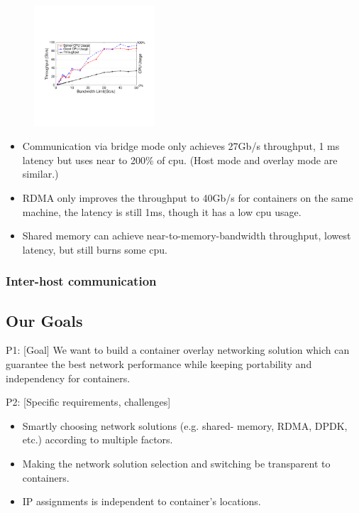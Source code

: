      \begin{figure}[ht]
     \centering 
     \includegraphics[width=0.4\textwidth]{figures/motivation/eval_bw_cpu.pdf}      
     \label{fig:eval_bw_cpu}
     \caption{} 
     \end{figure}
     
\begin{itemize}
  \item Communication via bridge mode only achieves 27Gb/s throughput, 1 ms latency but uses near to 200\% of cpu. (Host mode and overlay mode are similar.)
  \item RDMA only improves the throughput to 40Gb/s for containers on the same machine, the latency is still 1ms, though it has a low cpu usage.
  \item Shared memory can achieve near-to-memory-bandwidth throughput, lowest latency, but still burns some cpu. 
\end{itemize}


\subsubsection{Inter-host communication}



\subsection{Our Goals}
P1: [Goal] We want to build a container overlay networking solution which can guarantee the best network performance while keeping portability and independency for containers.

P2: [Specific requirements, challenges]
\begin{itemize}
  \item Smartly choosing network solutions (e.g. shared- memory, RDMA, DPDK, etc.) according to multiple factors.
  \item Making the network solution selection and switching be transparent to containers.
  \item IP assignments is independent to container's locations.
\end{itemize}

